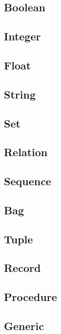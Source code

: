 \documentclass{article}
\begin{document}
\subsection{Boolean}
\subsection{Integer}
\subsection{Float}
\subsection{String}
\subsection{Set}
\subsection{Relation}
\subsection{Sequence}
\subsection{Bag}
\subsection{Tuple}
\subsection{Record}
\subsection{Procedure}
\subsection{Generic}
\end{document}
